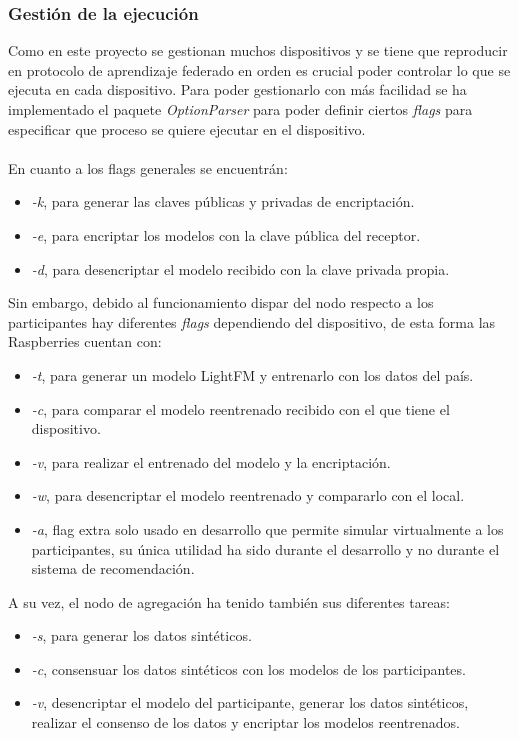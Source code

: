 \subsubsection{Gestión de la ejecución}
Como en este proyecto se gestionan muchos dispositivos y se tiene que reproducir en protocolo de aprendizaje federado en orden es crucial poder controlar lo que se ejecuta en cada dispositivo. Para poder gestionarlo con más facilidad se ha implementado el paquete \textit{OptionParser} para poder definir ciertos \textit{flags} para especificar que proceso se quiere ejecutar en el dispositivo.
\\ \\
En cuanto a los flags generales se encuentrán:
\begin{itemize}
    \item \textit{-k}, para generar las claves públicas y privadas de encriptación.
    \item \textit{-e}, para encriptar los modelos con la clave pública del receptor.
    \item \textit{-d}, para desencriptar el modelo recibido con la clave privada propia.
\end{itemize}   
Sin embargo, debido al funcionamiento dispar del nodo respecto a los participantes hay diferentes \textit{flags} dependiendo del dispositivo, de esta forma las Raspberries cuentan con:
\begin{itemize}
    \item \textit{-t}, para generar un modelo LightFM y entrenarlo con los datos del país.
    \item \textit{-c}, para comparar el modelo reentrenado recibido con el que tiene el dispositivo.
    \item \textit{-v}, para realizar el entrenado del modelo y la encriptación.
    \item \textit{-w}, para desencriptar el modelo reentrenado y compararlo con el local.
    \item \textit{-a}, flag extra solo usado en desarrollo que permite simular virtualmente a los participantes, su única utilidad ha sido durante el desarrollo y no durante el sistema de recomendación.
\end{itemize}
A su vez, el nodo de agregación ha tenido también sus diferentes tareas:
\begin{itemize}
    \item \textit{-s}, para generar los datos sintéticos.
    \item \textit{-c}, consensuar los datos sintéticos con los modelos de los participantes.
    \item \textit{-v}, desencriptar el modelo del participante, generar los datos sintéticos, realizar el consenso de los datos y encriptar los modelos reentrenados.
\end{itemize}
